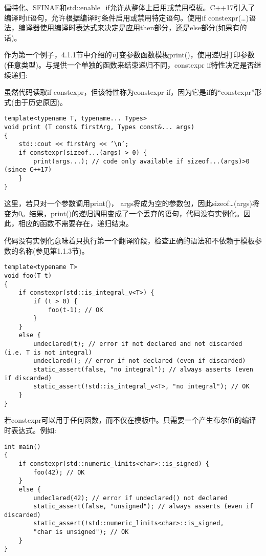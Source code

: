 偏特化、SFINAE和std::enable\_if允许从整体上启用或禁用模板。C++17引入了编译时if语句，允许根据编译时条件启用或禁用特定语句。使用if constexpr(…)语法，编译器使用编译时表达式来决定是应用then部分，还是else部分(如果有的话)。

作为第一个例子，4.1.1节中介绍的可变参数函数模板print()，使用递归打印参数(任意类型)。与提供一个单独的函数来结束递归不同，constexpr if特性决定是否继续递归:

\begin{tcolorbox}[colback=webgreen!5!white,colframe=webgreen!75!black]
\hspace*{0.75cm}虽然代码读取if constexpr，但该特性称为constexpr if，因为它是if的“constexpr”形式(由于历史原因)。
\end{tcolorbox}

\begin{lstlisting}[style=styleCXX]
template<typename T, typename... Types>
void print (T const& firstArg, Types const&... args)
{
	std::cout << firstArg << ’\n’;
	if constexpr(sizeof...(args) > 0) {
		print(args...); // code only available if sizeof...(args)>0 (since C++17)
	}
}
\end{lstlisting}

这里，若只对一个参数调用print()， args将成为空的参数包，因此sizeof…(args)将变为0。结果，print()的递归调用变成了一个丢弃的语句，代码没有实例化。因此，相应的函数不需要存在，递归结束。

代码没有实例化意味着只执行第一个翻译阶段，检查正确的语法和不依赖于模板参数的名称(参见第1.1.3节)。

\begin{lstlisting}[style=styleCXX]
template<typename T>
void foo(T t)
{
	if constexpr(std::is_integral_v<T>) {
		if (t > 0) {
			foo(t-1); // OK
		}
	}
	else {
		undeclared(t); // error if not declared and not discarded (i.e. T is not integral)
		undeclared(); // error if not declared (even if discarded)
		static_assert(false, "no integral"); // always asserts (even if discarded)
		static_assert(!std::is_integral_v<T>, "no integral"); // OK
	}
}
\end{lstlisting}

若constexpr可以用于任何函数，而不仅在模板中。只需要一个产生布尔值的编译时表达式。例如:

\begin{lstlisting}[style=styleCXX]
int main()
{
	if constexpr(std::numeric_limits<char>::is_signed) {
		foo(42); // OK
	}
	else {
		undeclared(42); // error if undeclared() not declared
		static_assert(false, "unsigned"); // always asserts (even if discarded)
		static_assert(!std::numeric_limits<char>::is_signed,
		"char is unsigned"); // OK
	}
}
\end{lstlisting}

